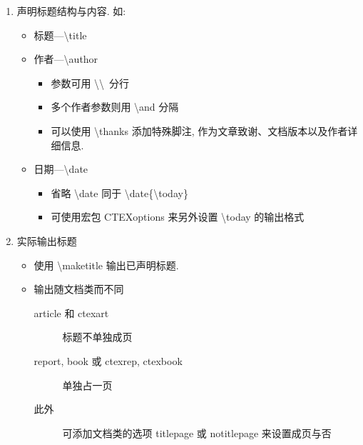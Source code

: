 \documentclass[UTF8]{ctexart}
\begin{document}
            \begin{enumerate}

                \item 声明标题结构与内容. 如: 
                \begin{itemize}
                    \item 标题---\textbackslash title
                    \item 作者---\textbackslash author
                    \begin{itemize}
                        \item 参数可用 \textbackslash\textbackslash\ 分行
                        \item 多个作者参数则用 \textbackslash and 分隔
                        \item 可以使用 \textbackslash thanks 添加特殊脚注, 作为文章致谢、文档版本以及作者详细信息. 
                    \end{itemize}
                    \item 日期---\textbackslash date
                    \begin{itemize}
                        \item 省略 \textbackslash date 同于 \textbackslash date\{\textbackslash today\}
                        \item 可使用宏包 CTEXoptions 来另外设置 \textbackslash today 的输出格式
                    \end{itemize}
                \end{itemize}

                \item 实际输出标题
                \begin{itemize}
                    \item 使用 \textbackslash maketitle 输出已声明标题.
                    \item 输出随文档类而不同
                    \begin{description}
                        \item[article 和 ctexart] 标题不单独成页
                        \item[report, book 或 ctexrep, ctexbook] 单独占一页 
                        \item[此外] 可添加文档类的选项 titlepage 或 notitlepage 来设置成页与否
                    \end{description}
                \end{itemize}


\end{enumerate}
\end{document}
